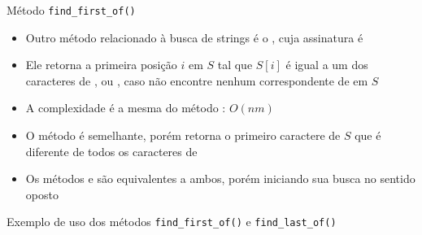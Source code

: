\begin{frame}[fragile]{Método {\tt find\_first\_of()}}

    \begin{itemize}
        \item Outro método relacionado à busca de strings é o , cuja
            assinatura é

        \vspace{.1in}
        \vspace{.1in}
        
        \item Ele retorna a primeira posição $i$ em $S$ tal que $S[i]$ é igual a um dos 
            caracteres de , ou , caso não encontre
            nenhum correspondente de  em $S$

        \item A complexidade é a mesma do método : $O(nm)$ 

        \item O método  é semelhante, porém retorna o primeiro
            caractere de $S$ que é diferente de todos os caracteres de 

        \item Os métodos  e  são
            equivalentes a ambos, porém iniciando sua busca no sentido oposto
    \end{itemize}

\end{frame}

\begin{frame}[fragile]{Exemplo de uso dos métodos {\tt find\_first\_of()} e {\tt find\_last\_of()}}
\end{frame}


